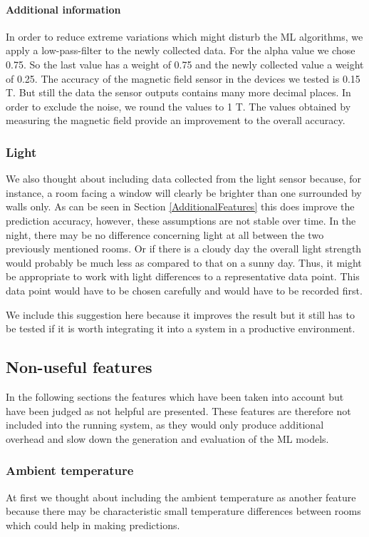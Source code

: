 \paragraph{Additional information}
In order to reduce extreme variations which might disturb the ML algorithms, we apply a low-pass-filter to the newly collected data. For the alpha value we chose 0.75. So the last value has a weight of 0.75 and the newly collected value a weight of 0.25.
The accuracy of the magnetic field sensor in the devices we tested is 0.15 \textmu T. But still the data the sensor outputs contains many more decimal places. In order to exclude the noise, we round the values to 1 \textmu T. 
The values obtained by measuring the magnetic field provide an improvement to the overall accuracy.



\subsubsection{Light}
We also thought about including data collected from the light sensor because, for instance, a room facing a window will clearly be brighter than one surrounded by walls only. As can be seen in Section \ref{AdditionalFeatures} this does improve the prediction accuracy, however, these assumptions are not stable over time. In the night, there may be no difference concerning light at all between the two previously mentioned rooms. Or if there is a cloudy day the overall light strength would probably be much less as compared to that on a sunny day. Thus, it might be appropriate to work with light differences to a representative data point. This data point would have to be chosen carefully and would have to be recorded first. 

We include this suggestion here because it improves the result but it still has to be tested if it is worth integrating it into a system in a productive environment.


\subsection{Non-useful features}
In the following sections the features which have been taken into account but have been judged as not helpful are presented. These features are therefore not included into the running system, as they would only produce additional overhead and slow down the generation and evaluation of the ML models.

\subsubsection{Ambient temperature}
At first we thought about including the ambient temperature as another feature because there may be characteristic small temperature differences between rooms which could help in making predictions.

